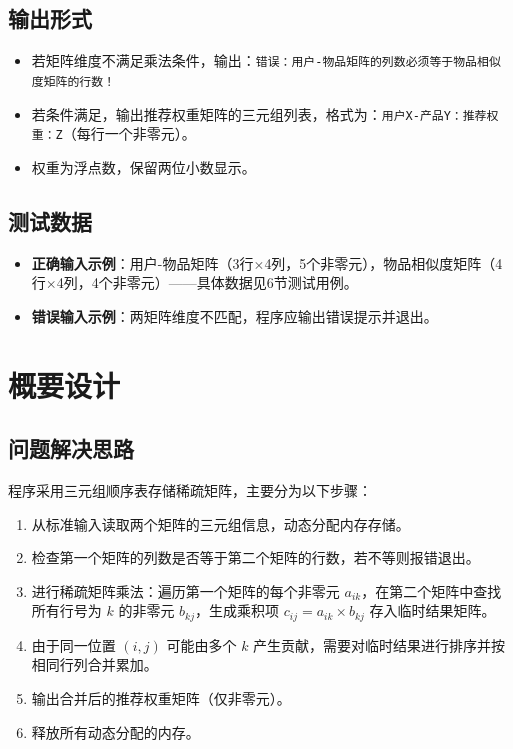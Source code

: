\documentclass[UTF8]{ctexart}
\begin{document}
\subsection{输出形式}
\begin{itemize}
    \item 若矩阵维度不满足乘法条件，输出：\texttt{错误：用户-物品矩阵的列数必须等于物品相似度矩阵的行数！}
    \item 若条件满足，输出推荐权重矩阵的三元组列表，格式为：\texttt{用户X-产品Y：推荐权重：Z}（每行一个非零元）。
    \item 权重为浮点数，保留两位小数显示。
\end{itemize}

\subsection{测试数据}
\begin{itemize}
    \item \textbf{正确输入示例}：用户-物品矩阵（3行$\times$4列，5个非零元），物品相似度矩阵（4行$\times$4列，4个非零元）——具体数据见6节测试用例。
    \item \textbf{错误输入示例}：两矩阵维度不匹配，程序应输出错误提示并退出。
\end{itemize}

\section{概要设计}

\subsection{问题解决思路}
程序采用三元组顺序表存储稀疏矩阵，主要分为以下步骤：
\begin{enumerate}
    \item 从标准输入读取两个矩阵的三元组信息，动态分配内存存储。
    \item 检查第一个矩阵的列数是否等于第二个矩阵的行数，若不等则报错退出。
    \item 进行稀疏矩阵乘法：遍历第一个矩阵的每个非零元 $a_{ik}$，在第二个矩阵中查找所有行号为 $k$ 的非零元 $b_{kj}$，生成乘积项 $c_{ij} = a_{ik} \times b_{kj}$ 存入临时结果矩阵。
    \item 由于同一位置 $(i,j)$ 可能由多个 $k$ 产生贡献，需要对临时结果进行排序并按相同行列合并累加。
    \item 输出合并后的推荐权重矩阵（仅非零元）。
    \item 释放所有动态分配的内存。
\end{enumerate}
\end{document}
